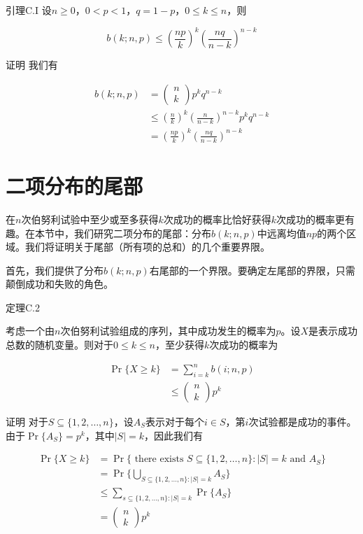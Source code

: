\documentclass[lang=cn,newtx,10pt,scheme=chinese]{elegantbook}
\begin{document}
引理C.I
设$n \geq 0$，$0<p<1$，$q=1-p$，$0 \leq k \leq n$，则

$$
b(k ; n, p) \leq(\frac{n p}{k})^k(\frac{n q}{n-k})^{n-k}
$$

证明 我们有

$$
\begin{aligned}
b(k ; n, p) & =(\begin{array}{l}
n \\
k
\end{array}) p^k q^{n-k} \\
& \leq(\frac{n}{k})^k(\frac{n}{n-k})^{n-k} p^k q^{n-k} \\
& =(\frac{n p}{k})^k(\frac{n q}{n-k})^{n-k}
\end{aligned}
$$

\section{二项分布的尾部}\label{section:C.5}

在$n$次伯努利试验中至少或至多获得$k$次成功的概率比恰好获得$k$次成功的概率更有趣。在本节中，我们研究二项分布的尾部：分布$b(k;n,p)$中远离均值$np$的两个区域。我们将证明关于尾部（所有项的总和）的几个重要界限。

首先，我们提供了分布$b(k;n,p)$右尾部的一个界限。要确定左尾部的界限，只需颠倒成功和失败的角色。

定理C.2

考虑一个由$n$次伯努利试验组成的序列，其中成功发生的概率为$p$。设$X$是表示成功总数的随机变量。则对于$0 \leq k \leq n$，至少获得$k$次成功的概率为

$$
\begin{aligned}
\operatorname{Pr}\{X \geq k\} & =\sum_{i=k}^n b(i ; n, p) \\
& \leq(\begin{array}{l}
n \\
k
\end{array}) p^k
\end{aligned}
$$

证明 对于$S \subseteq\{1,2, \ldots, n\}$，设$A_S$表示对于每个$i \in S$，第$i$次试验都是成功的事件。由于$\operatorname{Pr}\{A_S\}=p^k$，其中$|S|=k$，因此我们有

$$
\begin{aligned}
\operatorname{Pr}\{X \geq k\} & =\operatorname{Pr}\{\text { there exists } S \subseteq\{1,2, \ldots, n\}:|S|=k \text { and } A_S\} \\
& =\operatorname{Pr}\{\bigcup_{S \subseteq\{1,2, \ldots, n\}:|S|=k} A_S\} \\
& \leq \sum_{s \subseteq\{1,2, \ldots, n\}:|S|=k} \operatorname{Pr}\{A_S\} \\
& =(\begin{array}{l}
n \\
k
\end{array}) p^k
\end{aligned}
$$
\end{document}
